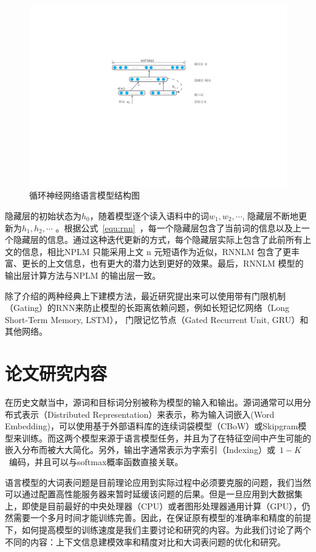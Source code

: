 \begin{figure}
  \centering
  \includegraphics[width=.8\linewidth]{./figures/rnnlm.pdf}
  \caption{循环神经网络语言模型结构图}\label{fig:rnnlm}
\end{figure}

隐藏层的初始状态为$h_0$，随着模型逐个读入语料中的词$w_1,w_2,\cdots$, 隐藏层不断地更新为$h_1,h_2,\cdots$ 。根据公式~\ref{equ:rnn}~，每一个隐藏层包含了当前词的信息以及上一个隐藏层的信息。通过这种迭代更新的方式，每个隐藏层实际上包含了此前所有上文的信息，相比NPLM 只能采用上文 n 元短语作为近似，RNNLM 包含了更丰富、更长的上文信息，也有更大的潜力达到更好的效果。最后，RNNLM 模型的输出层计算方法与NPLM 的输出层一致。


除了介绍的两种经典上下建模方法，最近研究提出来可以使用带有门限机制（Gating）的RNN来防止模型的长距离依赖问题，例如长短记忆网络（Long Short-Term Memory, LSTM）， 门限记忆节点（Gated Recurrent Unit, GRU）和其他网络。


\section{论文研究内容}
在历史文献当中，源词和目标词分别被称为模型的输入和输出。源词通常可以用分布式表示（Distributed Representation）来表示，称为输入词嵌入(Word Embedding)，可以使用基于外部语料库的连续词袋模型（CBoW）或Skipgram模型来训练。而这两个模型来源于语言模型任务，并且为了在特征空间中产生可能的嵌入分布而被大大简化。另外，输出字通常表示为字索引（Indexing）或~$1-K$~编码，并且可以与softmax概率函数直接关联。

语言模型的大词表问题是目前理论应用到实际过程中必须要克服的问题，我们当然可以通过配置高性能服务器来暂时延缓该问题的后果。但是一旦应用到大数据集上，即使是目前最好的中央处理器（CPU）或者图形处理器通用计算（GPU），仍然需要一个多月时间才能训练完善。因此，在保证原有模型的准确率和精度的前提下，如何提高模型的训练速度是我们主要讨论和研究的内容。为此我们讨论了两个不同的内容：上下文信息建模效率和精度对比和大词表问题的优化和研究。

